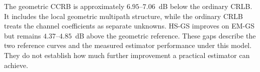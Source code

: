 
The geometric CCRB is approximately $6.95$--$7.06$~dB below the ordinary
CRLB. It includes the local geometric multipath structure, while the
ordinary CRLB treats the channel coefficients as separate unknowns.
HS-GS improves on EM-GS but remains $4.37$--$4.85$~dB above the geometric
reference. These gaps describe the two reference curves and the measured
estimator performance under this model. They do not establish how much
further improvement a practical estimator can achieve.
